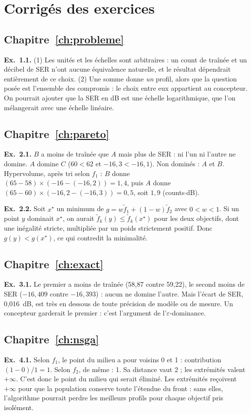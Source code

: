 \chapter{Corrigés des exercices}\label{annexe:corriges}

\section*{Chapitre~\ref{ch:probleme}}
\textbf{Ex.~1.1.} (1) Les unités et les échelles sont arbitraires : un count de traînée et un décibel de SER n'ont aucune équivalence naturelle, et le résultat dépendrait entièrement de ce choix. (2) Une somme donne \emph{un} profil, alors que la question posée est l'ensemble des compromis : le choix entre eux appartient au concepteur. On pourrait ajouter que la SER en dB est une échelle logarithmique, que l'on mélangerait avec une échelle linéaire.

\section*{Chapitre~\ref{ch:pareto}}
\textbf{Ex.~2.1.} $B$ a moins de traînée que $A$ mais plus de SER : ni l'un ni l'autre ne domine. $A$ domine $C$ ($60<62$ et $-16{,}3<-16{,}1$). Non dominés : $A$ et $B$. Hypervolume, après tri selon $f_1$ : $B$ donne $(65-58)\times(-16-(-16{,}2))=1{,}4$, puis $A$ donne $(65-60)\times(-16{,}2-(-16{,}3))=0{,}5$, soit $1{,}9$ (counts$\cdot$dB).

\textbf{Ex.~2.2.} Soit $x^\star$ un minimum de $g=w\tilde f_1+(1-w)\tilde f_2$ avec $0<w<1$. Si un point $y$ dominait $x^\star$, on aurait $\tilde f_k(y)\le\tilde f_k(x^\star)$ pour les deux objectifs, dont une inégalité stricte, multipliée par un poids strictement positif. Donc $g(y)<g(x^\star)$, ce qui contredit la minimalité.

\section*{Chapitre~\ref{ch:exact}}
\textbf{Ex.~3.1.} Le premier a moins de traînée (58,87 contre 59,22), le second moins de SER ($-16{,}409$ contre $-16{,}393$) : aucun ne domine l'autre. Mais l'écart de SER, 0,016~dB, est très en dessous de toute précision de modèle ou de mesure. Un concepteur garderait le premier : c'est l'argument de l'$\varepsilon$-dominance.

\section*{Chapitre~\ref{ch:nsga}}
\textbf{Ex.~4.1.} Selon $f_1$, le point du milieu a pour voisins 0 et 1 : contribution $(1-0)/1=1$. Selon $f_2$, de même : 1. Sa distance vaut 2 ; les extrémités valent $+\infty$. C'est donc le point du milieu qui serait éliminé. Les extrémités reçoivent $+\infty$ pour que la population conserve toute l'étendue du front : sans elles, l'algorithme pourrait perdre les meilleurs profils pour chaque objectif pris isolément.

